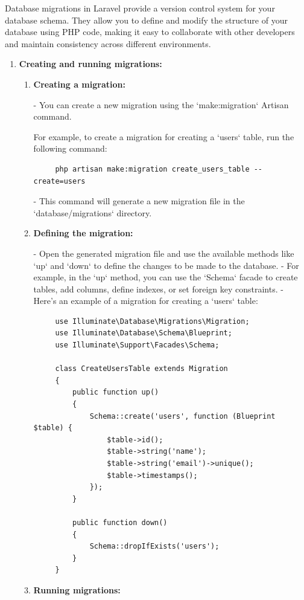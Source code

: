 Database migrations in Laravel provide a version control system for your database schema. They allow you to define and modify the structure of your database using PHP code, making it easy to collaborate with other developers and maintain consistency across different environments.
\begin{enumerate}
\medskip \item \textbf{Creating and running migrations:}
\begin{enumerate}
    

\item \textbf{Creating a migration:}
   
- You can create a new migration using the `make:migration` Artisan command. 
   
   For example, to create a migration for creating a `users` table, run the following command:
   \begin{verbatim}
     php artisan make:migration create_users_table --create=users
   \end{verbatim}
   - This command will generate a new migration file in the `database/migrations` directory.

\item \textbf{Defining the migration:}
   
- Open the generated migration file and use the available methods like `up` and `down` to define the changes to be made to the database.
   - For example, in the `up` method, you can use the `Schema` facade to create tables, add columns, define indexes, or set foreign key constraints.
   - Here's an example of a migration for creating a `users` table:
\begin{verbatim}
     use Illuminate\Database\Migrations\Migration;
     use Illuminate\Database\Schema\Blueprint;
     use Illuminate\Support\Facades\Schema;

     class CreateUsersTable extends Migration
     {
         public function up()
         {
             Schema::create('users', function (Blueprint $table) {
                 $table->id();
                 $table->string('name');
                 $table->string('email')->unique();
                 $table->timestamps();
             });
         }

         public function down()
         {
             Schema::dropIfExists('users');
         }
     }
\end{verbatim}

\item \textbf{Running migrations:}
   

\end{enumerate}
\end{enumerate}
